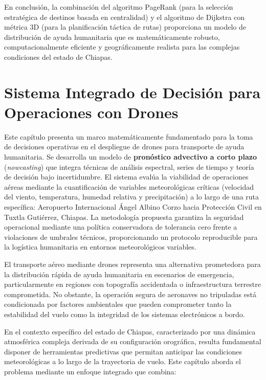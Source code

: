 \documentclass[
  spanish,
  us-letterpaper,
]{scrreprt}
\numberwithin{equation}{section}
\begin{document}
En conclusión, la combinación del algoritmo PageRank (para la selección
estratégica de destinos basada en centralidad) y el algoritmo de
Dijkstra con métrica 3D (para la planificación táctica de rutas)
proporciona un modelo de distribución de ayuda humanitaria que es
matemáticamente robusto, computacionalmente eficiente y geográficamente
realista para las complejas condiciones del estado de Chiapas.


\chapter{Sistema Integrado de Decisión para Operaciones con
Drones}\label{sistema-integrado-de-decisiuxf3n-para-operaciones-con-drones}

Este capítulo presenta un marco matemáticamente fundamentado para la
toma de decisiones operativas en el despliegue de drones para transporte
de ayuda humanitaria. Se desarrolla un modelo de \textbf{pronóstico
advectivo a corto plazo} (\emph{nowcasting}) que integra técnicas de
análisis espectral, series de tiempo y teoría de decisión bajo
incertidumbre. El sistema evalúa la viabilidad de operaciones aéreas
mediante la cuantificación de variables meteorológicas críticas
(velocidad del viento, temperatura, humedad relativa y precipitación) a
lo largo de una ruta específica: Aeropuerto Internacional Ángel Albino
Corzo hacia Protección Civil en Tuxtla Gutiérrez, Chiapas. La
metodología propuesta garantiza la seguridad operacional mediante una
política conservadora de tolerancia cero frente a violaciones de
umbrales técnicos, proporcionando un protocolo reproducible para la
logística humanitaria en entornos meteorológicos variables.

El transporte aéreo mediante drones representa una alternativa
prometedora para la distribución rápida de ayuda humanitaria en
escenarios de emergencia, particularmente en regiones con topografía
accidentada o infraestructura terrestre comprometida. No obstante, la
operación segura de aeronaves no tripuladas está condicionada por
factores ambientales que pueden comprometer tanto la estabilidad del
vuelo como la integridad de los sistemas electrónicos a bordo.

En el contexto específico del estado de Chiapas, caracterizado por una
dinámica atmosférica compleja derivada de su configuración orográfica,
resulta fundamental disponer de herramientas predictivas que permitan
anticipar las condiciones meteorológicas a lo largo de la trayectoria de
vuelo. Este capítulo aborda el problema mediante un enfoque integrado
que combina:
\end{document}
